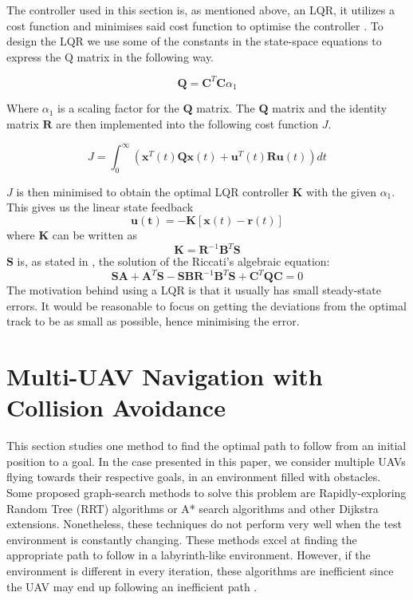 \documentclass[journal, twoside]{IEEEtran}
\begin{document}
	The controller used in this section is, as mentioned above, an LQR, it utilizes a cost function and minimises said cost function to optimise the controller \cite{bokLQ}. To design the LQR we use some of the constants in the state-space equations to express the Q matrix in the following way.
	
	\begin{equation}
	\bm{Q}=\bm{C}^{T}\bm{C}\alpha_{1}
	\end{equation}
	
	Where $\alpha_{1}$ is a scaling factor for the $\bm{Q}$ matrix.
	The $\bm{Q}$ matrix and the identity matrix $\bm{R}$ are then implemented into the following cost function $J$.
	
	\begin{equation}\label{eq:costfunctionJ}
	J = \int_{0}^{\infty} (\bm{x}^{T}(t)\bm{Q}\bm{x}(t)+\bm{u}^{T}(t)\bm{R}\bm{u}(t)) dt
	\end{equation}
	
	$J$ is then minimised to obtain the optimal LQR controller $\bm{K}$ with the given $\alpha_{1}$. This gives us the	linear state  feedback
	\begin{equation}\label{eq:linearstatefeedback}
	\bm{u(t)} = -\bm{K}[\bm{x}(t)-\bm{r}(t)]
\end{equation}
	where $\bm{K}$ can be written as		
	\begin{equation}\label{eq:linearstatefeedback2}
		\bm{K} = \bm{R}^{-1}\bm{B}^T\bm{S}
	\end{equation}
		$\bm{S}$ is, as stated in \cite{mod_control_bresciani}, the solution of the Riccati's algebraic equation: 
	\begin{equation}\label{eq:linearstatefeedback3}
		\bm{S}\bm{A} + \bm{A}^T\bm{S} - \bm{S}\bm{B}\bm{R}^{-1}\bm{B}^T\bm{S} + \bm{C}^T\bm{Q}\bm{C} = 0
	\end{equation}	
	 The motivation behind using a LQR is that it usually has small steady-state errors\cite{lqr_error}. It would be reasonable to focus on getting the deviations from the optimal track to be as small as possible, hence minimising the error.   
	
		
	\section{Multi-UAV Navigation with Collision Avoidance}\label{navigation}
		This section studies one method to find the optimal path to follow from an initial position to a goal. In the case presented in this paper, we consider multiple UAVs flying towards their respective goals, in an environment filled with obstacles. Some proposed graph-search methods to solve this problem are Rapidly-exploring Random Tree (RRT) algorithms or A* search algorithms and other Dijkstra extensions.	Nonetheless, these techniques do not perform very well when the test environment is constantly changing. These methods excel at finding the appropriate path to follow in a labyrinth-like environment. However, if the environment is different in every iteration, these algorithms are inefficient since the UAV may end up following an inefficient path \cite{lavalle_rrt, lavalle_astar}.\\
		
\end{document}
